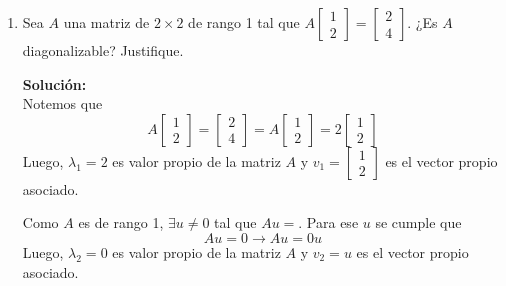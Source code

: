\documentclass[12pt]{article}
\newenvironment{solucion}
{\begin{mdframed}[backgroundcolor=black!10]
		{\bf Solución:}\\
	}
	{
	\end{mdframed}
}
\newenvironment{preguntas}
{\begin{enumerate}\itemsep12pt
	}
	{
	\end{enumerate}
}
\newcommand{\ra}{\rightarrow}
\begin{document}
\begin{preguntas}
\begin{solucion}
		Notemos que
		$$\begin{array}{lcl}
		q(A) & = & 2I - A^2 + 4A^3\\
		q(A) u & = & (2I - A^2 + 4A^3)u\\
		& = & 2Iu - A^2u + 4A^3u \\
		& = & 2Iu - A(Au) + 4A^2(Au) \\
		& = & 2Iu - A0 + 4A^20 \\
		& = & 2Iu \\
		q(A) u & = & 2u
		\end{array}$$
		Luego, $\lambda = 2 $ es $VP$ de $q(A)$
\end{solucion}
\item Sea $A$ una matriz de $2\times 2$ de rango 1 tal que $A\begin{bmatrix} 1 \\ 2\end{bmatrix} = \begin{bmatrix} 2 \\ 4 \end{bmatrix}$. ¿Es $A$ diagonalizable? Justifique.
\begin{solucion}
Notemos que
		$$A\begin{bmatrix} 1 \\ 2\end{bmatrix} = \begin{bmatrix} 2 \\ 4 \end{bmatrix}
		= A\begin{bmatrix} 1 \\ 2\end{bmatrix} = 2\begin{bmatrix} 1 \\ 2 \end{bmatrix}$$
		Luego, $\lambda_1 = 2$ es valor propio de la matriz $A$ y $v_1 = \begin{bmatrix} 1 \\ 2\end{bmatrix}$ es el vector propio asociado.
		
		Como $A$ es de rango 1, $\exists u \neq 0$ tal que $Au = $. Para ese $u$ se cumple que
		$$Au = 0 \ra Au = 0 u$$
		Luego, $\lambda_2 = 0$ es valor propio de la matriz $A$ y $v_2 = u$ es el vector propio asociado.
		

\end{solucion}
\end{preguntas}
\end{document}

